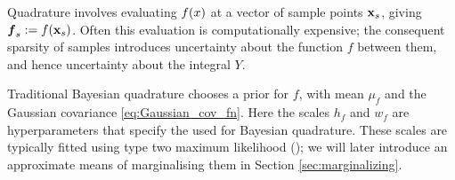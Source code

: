 \documentclass{article}
\begin{document}
Quadrature involves evaluating $f(\lfv)$ at a vector of sample points $\vlfv_s$, giving $\vf\pha_s\deq f(\vlfv_s)$. Often this evaluation is computationally expensive; the consequent sparsity of samples introduces uncertainty about the function $f$ between them, and hence uncertainty about the integral $Y$.



Traditional Bayesian quadrature chooses a \gpb prior for $f$, with mean $\mu_f$ and the Gaussian covariance \eqref{eq:Gaussian_cov_fn}. Here the scales $h_f$ and $w_f$ are hyperparameters that specify the  \gpb used for Bayesian quadrature. These scales are typically fitted using type two maximum likelihood (); we will later introduce an approximate means of marginalising them in Section \ref{sec:marginalizing}.

\end{document}
